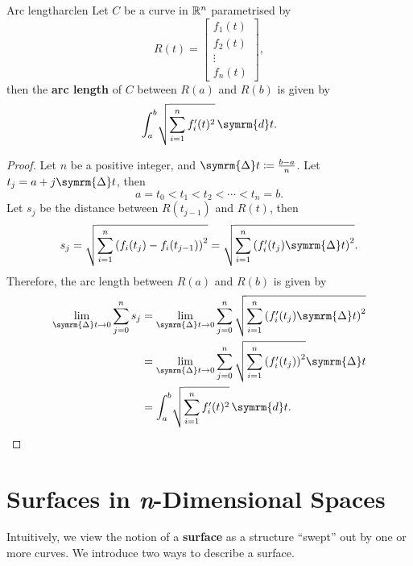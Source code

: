 \documentclass[math]{amznotes}
\theoremstyle{remark}
\begin{document}
\begin{thmbox}{Arc length}{arclen}
    Let $C$ be a curve in $\mathbb{R}^n$ parametrised by
    \begin{equation*}
        R(t) = \left[\begin{array}{c}
                f_1(t) \\
                f_2(t) \\
                \vdots \\
                f_n(t)
            \end{array}\right],
    \end{equation*}
    then the {\color{red} \textbf{arc length}} of $C$ between $R(a)$ and $R(b)$ is given by
    \begin{displaymath}
        \int_a^b \!\sqrt{\sum_{i = 1}^{n}f'_i(t)^2} \,\symrm{d}t.
    \end{displaymath}
    \tcblower
    \begin{proof}
        Let $n$ be a positive integer, and $\symrm{\Delta}t \coloneq \frac{b - a}{n}$. Let $t_j = a + j\symrm{\Delta}t$, then
        \begin{displaymath}
            a = t_0 < t_1 < t_2 < \cdots < t_n = b.
        \end{displaymath}
        Let $s_j$ be the distance between $R(t_{j - 1})$ and $R(t)$, then
        \begin{equation*}
            s_j = \sqrt{\sum_{i = 1}^n \left(f_i(t_j) - f_i(t_{j - 1})\right)^2} = \sqrt{\sum_{i = 1}^n \left(f'_i(t_j)\symrm{\Delta}t\right)^2}.
        \end{equation*}
        Therefore, the arc length between $R(a)$ and $R(b)$ is given by
        \begin{align*}
            \lim_{\symrm{\Delta}t \to 0} \sum_{j = 0}^{n}s_j & = \lim_{\symrm{\Delta}t \to 0} \sum_{j = 0}^{n}\sqrt{\sum_{i = 1}^n \left(f'_i(t_j)\symrm{\Delta}t\right)^2} \\
                                                             & = \lim_{\symrm{\Delta}t \to 0} \sum_{j = 0}^{n}\sqrt{\sum_{i = 1}^n \left(f'_i(t_j)\right)^2}\symrm{\Delta}t \\
                                                             & = \int_a^b \!\sqrt{\sum_{i = 1}^{n}f'_i(t)^2} \,\symrm{d}t.
        \end{align*}
    \end{proof}
\end{thmbox}
\section{Surfaces in \textit{n}-Dimensional Spaces}
Intuitively, we view the notion of a {\color{red} \textbf{surface}} as a structure ``swept'' out by one or more curves. We introduce two ways to describe a surface.
\end{document}

